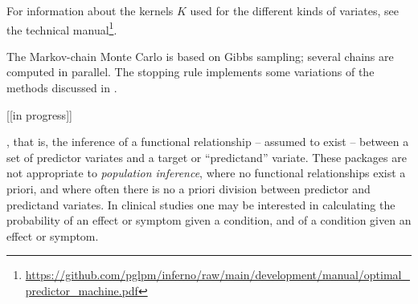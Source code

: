 For information about the kernels $K$ used for the different kinds of variates, see the technical manual\footnote{\url{https://github.com/pglpm/inferno/raw/main/development/manual/optimal_predictor_machine.pdf}}.

\medskip

The Markov-chain Monte Carlo is based on Gibbs sampling; several chains are computed in parallel. The stopping rule implements some variations of the methods discussed in \cite{vehtarietal2021}.

[[in progress]]



\citep{walker2010}





, that is, the inference of a functional relationship -- assumed to exist -- between a set of predictor variates and a target or ``predictand'' variate. These packages are not appropriate to \emph{population inference}, where no functional relationships exist a priori, and where often there is no a priori division between predictor and predictand variates. In clinical studies one may be interested in calculating the probability of an effect or symptom given a condition, and of a condition given an effect or symptom.
